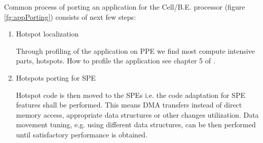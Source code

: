 Common process of porting an application for the \mbox{Cell/B.E.} processor (figure \ref{fg:appPorting}) consists of next few steps:
\begin{enumerate}
\item Hotspot localization
\par
Through profiling of the application on PPE we find most compute intensive parts, hotspots.
How to profile the application see chapter 5 of \cite{programmersGuide}.

\item Hotspots porting for SPE
\par
Hotspot code is then moved to the SPEs i.e. the code adaptation for SPE features shall be performed.
This means DMA transfers instead of direct memory access, appropriate data structures or other changes utilization.
Data movement tuning, e.g. using different data structures, can be then performed until satisfactory performance is obtained.
\end{enumerate}

